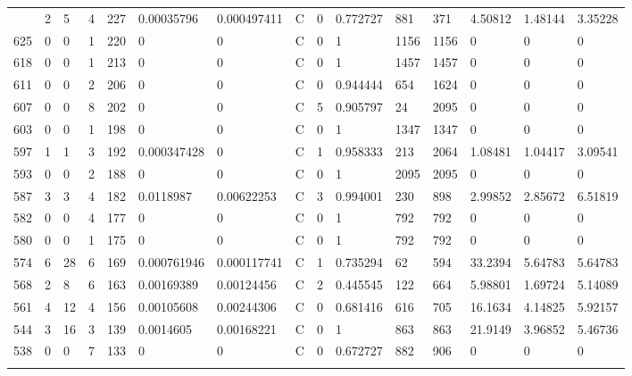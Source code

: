 \begin{latin}
\begin{longtable}{lllllllllllllll}
\begin{comment}
	632 & 2  & 5   & 4  & 227 & 0.00035796     & 0.000497411    & C & 0  & 0.772727 & 881  & 371  & 4.50812 & 1.48144 & 3.35228 \\
	625 & 0  & 0   & 1  & 220 & 0              & 0              & C & 0  & 1        & 1156 & 1156 & 0       & 0       & 0       \\
	618 & 0  & 0   & 1  & 213 & 0              & 0              & C & 0  & 1        & 1457 & 1457 & 0       & 0       & 0       \\
	611 & 0  & 0   & 2  & 206 & 0              & 0              & C & 0  & 0.944444 & 654  & 1624 & 0       & 0       & 0       \\
	607 & 0  & 0   & 8  & 202 & 0              & 0              & C & 5  & 0.905797 & 24   & 2095 & 0       & 0       & 0       \\
	603 & 0  & 0   & 1  & 198 & 0              & 0              & C & 0  & 1        & 1347 & 1347 & 0       & 0       & 0       \\
	597 & 1  & 1   & 3  & 192 & 0.000347428    & 0              & C & 1  & 0.958333 & 213  & 2064 & 1.08481 & 1.04417 & 3.09541 \\
	593 & 0  & 0   & 2  & 188 & 0              & 0              & C & 0  & 1        & 2095 & 2095 & 0       & 0       & 0       \\
	587 & 3  & 3   & 4  & 182 & 0.0118987      & 0.00622253     & C & 3  & 0.994001 & 230  & 898  & 2.99852 & 2.85672 & 6.51819 \\
	582 & 0  & 0   & 4  & 177 & 0              & 0              & C & 0  & 1        & 792  & 792  & 0       & 0       & 0       \\
	580 & 0  & 0   & 1  & 175 & 0              & 0              & C & 0  & 1        & 792  & 792  & 0       & 0       & 0       \\
	574 & 6  & 28  & 6  & 169 & 0.000761946    & 0.000117741    & C & 1  & 0.735294 & 62   & 594  & 33.2394 & 5.64783 & 5.64783 \\
	568 & 2  & 8   & 6  & 163 & 0.00169389     & 0.00124456     & C & 2  & 0.445545 & 122  & 664  & 5.98801 & 1.69724 & 5.14089 \\
	561 & 4  & 12  & 4  & 156 & 0.00105608     & 0.00244306     & C & 0  & 0.681416 & 616  & 705  & 16.1634 & 4.14825 & 5.92157 \\
	544 & 3  & 16  & 3  & 139 & 0.0014605      & 0.00168221     & C & 0  & 1        & 863  & 863  & 21.9149 & 3.96852 & 5.46736 \\
	538 & 0  & 0   & 7  & 133 & 0              & 0              & C & 0  & 0.672727 & 882  & 906  & 0       & 0       & 0       \\

\end{comment}
\end{longtable}
\end{latin}
